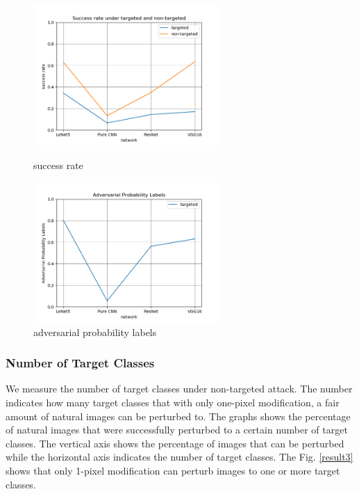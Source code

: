 \documentclass[runningheads]{llncs}
\begin{document}
\begin{figure}[h]
	\begin{minipage}[t]{0.5\textwidth}
		\centering
		\includegraphics[width=2.8in]{figures/result1.png}
		\caption{success rate} \label{result1}
	\end{minipage}
	\qquad
	\begin{minipage}[t]{0.5\textwidth}
		\centering
		\includegraphics[width=2.8in]{figures/result2.png}
		\caption{adversarial probability labels} \label{result2}
	\end{minipage}
\end{figure}

\subsubsection{Number of Target Classes} 
We measure the number of target classes under non-targeted attack. The number indicates how many target classes that with only one-pixel modification, a fair amount of natural images can be perturbed to. The graphs shows the percentage of natural images that were successfully perturbed to a certain number of target classes. The vertical axis shows the percentage of images that can be perturbed while the horizontal axis indicates the number of target classes. The Fig. \ref{result3} shows that only 1-pixel modification can perturb images to one or more target classes.
\end{document}
